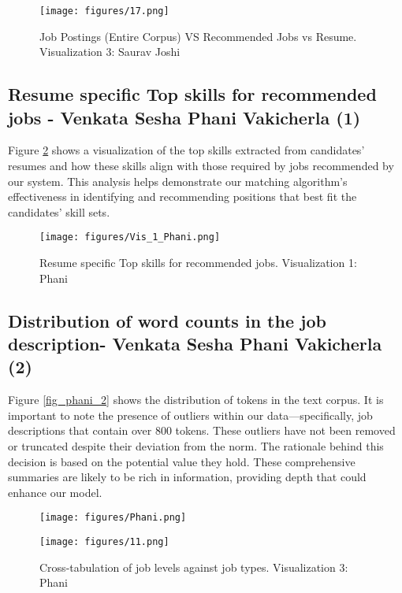 \documentclass[a4paper,10pt]{article}
\begin{document}
    \begin{figure}[ht]
    \centering
    \texttt{[image: figures/17.png]}
    \caption{Job Postings (Entire Corpus) VS Recommended Jobs vs Resume. Visualization 3: Saurav Joshi}
    \label{fig_tsne}
    \end{figure}
    

\subsection{Resume specific Top skills for recommended jobs - Venkata Sesha Phani Vakicherla (1)}

Figure \ref{fig_phani_1} shows a visualization of the top skills extracted from candidates' resumes and how these skills align with those required by jobs recommended by our system. This analysis helps demonstrate our matching algorithm's effectiveness in identifying and recommending positions that best fit the candidates' skill sets.

    \begin{figure}[ht]
    \centering
    \texttt{[image: figures/Vis\_1\_Phani.png]}
    \caption{Resume specific Top skills for recommended jobs. Visualization 1: Phani}
    \label{fig_phani_1}
    \end{figure}

\subsection{Distribution of word counts in the job description- Venkata Sesha Phani Vakicherla (2)}
Figure \ref{fig_phani_2} shows the distribution of tokens in the text corpus. It is important to note the presence of outliers within our data—specifically, job descriptions that contain over 800 tokens. These outliers have not been removed or truncated despite their deviation from the norm. The rationale behind this decision is based on the potential value they hold. These comprehensive summaries are likely to be rich in information, providing depth that could enhance our model.

\begin{figure}[H]
    \centering
    \begin{minipage}{0.5\textwidth}
        \centering
        \texttt{[image: figures/Phani.png]}
        \caption{Distribution of word counts in the job description. Visualization 2: Phani}
        \label{fig_phani_2}
    \end{minipage}%
    \hfill
    \begin{minipage}{0.48\textwidth}
        \centering
        \texttt{[image: figures/11.png]}
        \caption{Cross-tabulation of job levels against job types. Visualization 3: Phani}
        \label{fig_phani_3}
    \end{minipage}
\end{figure}
\end{document}

